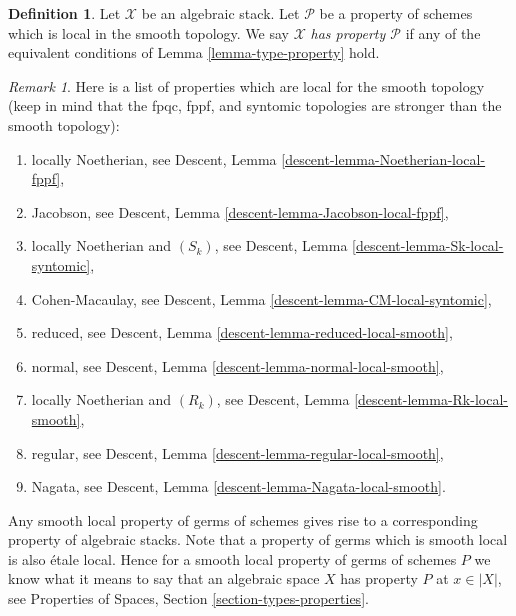 \documentclass{stacks-project}
\theoremstyle{plain}
\theoremstyle{definition}
\newtheorem{definition}[subsection]{Definition}
\theoremstyle{remark}
\newtheorem{remark}[subsection]{Remark}
\numberwithin{equation}{subsection}
\begin{document}
\begin{definition}
\label{definition-type-property}
Let $\mathcal{X}$ be an algebraic stack.
Let $\mathcal{P}$ be a property of schemes which is
local in the smooth topology.
We say $\mathcal{X}$ {\it has property $\mathcal{P}$}
if any of the equivalent conditions of
Lemma \ref{lemma-type-property}
hold.
\end{definition}

\begin{remark}
\label{remark-list-properties-local-smooth-topology}
Here is a list of properties which are local for the smooth topology
(keep in mind that the fpqc, fppf, and syntomic topologies are
stronger than the smooth topology):
\begin{enumerate}
\item locally Noetherian, see
Descent, Lemma \ref{descent-lemma-Noetherian-local-fppf},
\item Jacobson, see
Descent, Lemma \ref{descent-lemma-Jacobson-local-fppf},
\item locally Noetherian and $(S_k)$, see
Descent, Lemma \ref{descent-lemma-Sk-local-syntomic},
\item Cohen-Macaulay, see
Descent, Lemma \ref{descent-lemma-CM-local-syntomic},
\item reduced, see
Descent, Lemma \ref{descent-lemma-reduced-local-smooth},
\item normal, see
Descent, Lemma \ref{descent-lemma-normal-local-smooth},
\item locally Noetherian and $(R_k)$, see
Descent, Lemma \ref{descent-lemma-Rk-local-smooth},
\item regular, see
Descent, Lemma \ref{descent-lemma-regular-local-smooth},
\item Nagata, see
Descent, Lemma \ref{descent-lemma-Nagata-local-smooth}.
\end{enumerate}
\end{remark}

\noindent
Any smooth local property of germs of schemes gives rise to a corresponding
property of algebraic stacks. Note that a property of germs which is smooth
local is also \'etale local. Hence for a smooth local property of germs of
schemes $P$ we know what it means to say that an algebraic space $X$ has
property $P$ at $x \in |X|$, see
Properties of Spaces, Section \ref{section-types-properties}.
\end{document}
